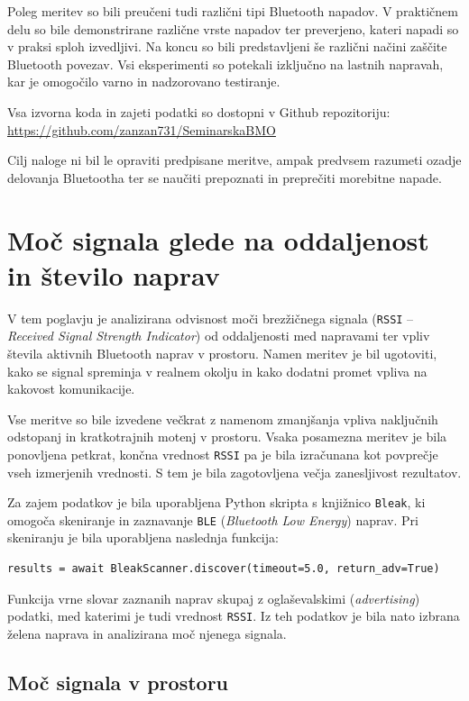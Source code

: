 \documentclass[11pt,a4paper,slovene]{article}
\begin{document}
Poleg meritev so bili preučeni tudi različni tipi Bluetooth napadov. V praktičnem delu so bile demonstrirane različne vrste napadov ter preverjeno, kateri napadi so v praksi sploh izvedljivi. Na koncu so bili predstavljeni še različni načini zaščite Bluetooth povezav. Vsi eksperimenti so potekali izključno na lastnih napravah, kar je omogočilo varno in nadzorovano testiranje.

Vsa izvorna koda in zajeti podatki so dostopni v Github repozitoriju: \url{https://github.com/zanzan731/SeminarskaBMO}

Cilj naloge ni bil le opraviti predpisane meritve, ampak predvsem razumeti ozadje delovanja Bluetootha ter se naučiti prepoznati in preprečiti morebitne napade.

\newpage

\section{Moč signala glede na oddaljenost in število naprav}

V tem poglavju je analizirana odvisnost moči brezžičnega signala (\texttt{RSSI} -- \textit{Received Signal Strength Indicator}) od oddaljenosti med napravami ter vpliv števila aktivnih Bluetooth naprav v prostoru. Namen meritev je bil ugotoviti, kako se signal spreminja v realnem okolju in kako dodatni promet vpliva na kakovost komunikacije.

Vse meritve so bile izvedene večkrat z namenom zmanjšanja vpliva naključnih odstopanj in kratkotrajnih motenj v prostoru. Vsaka posamezna meritev je bila ponovljena petkrat, končna vrednost \texttt{RSSI} pa je bila izračunana kot povprečje vseh izmerjenih vrednosti. S tem je bila zagotovljena večja zanesljivost rezultatov.

Za zajem podatkov je bila uporabljena Python skripta s knjižnico \texttt{Bleak}, ki omogoča skeniranje in zaznavanje \texttt{BLE} (\textit{Bluetooth Low Energy}) naprav. Pri skeniranju je bila uporabljena naslednja funkcija:

\begin{verbatim}
results = await BleakScanner.discover(timeout=5.0, return_adv=True)
\end{verbatim}

Funkcija vrne slovar zaznanih naprav skupaj z oglaševalskimi (\textit{advertising}) podatki, med katerimi je tudi vrednost \texttt{RSSI}. Iz teh podatkov je bila nato izbrana želena naprava in analizirana moč njenega signala.

\subsection{Moč signala v prostoru}
\end{document}
